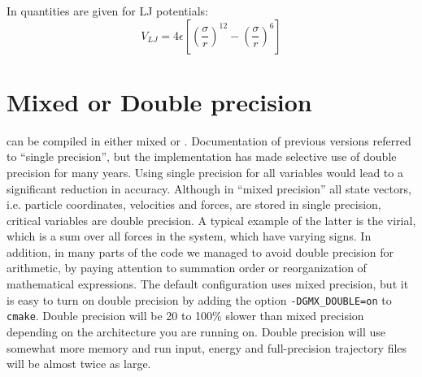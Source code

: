 In  quantities are given for LJ potentials:
\begin{equation}
V_{LJ} = 4\epsilon \left[ \left(\frac{\sigma}{r}\right)^{12} - \left(\frac{\sigma}{r}\right)^{6} \right]
\end{equation}



\section{Mixed or Double precision}
{\gromacs} can be compiled in either mixed or
. Documentation of previous {\gromacs}
versions referred to ``single precision'', but the implementation
has made selective use of double precision for many years.
Using single precision
for all variables would lead to a significant reduction in accuracy.
Although in ``mixed precision'' all state vectors, i.e. particle coordinates,
velocities and forces, are stored in single precision, critical variables
are double precision. A typical example of the latter is the virial,
which is a sum over all forces in the system, which have varying signs.
In addition, in many parts of the code we managed to avoid double precision
for arithmetic, by paying attention to summation order or reorganization
of mathematical expressions. The default configuration uses mixed precision,
but it is easy to turn on double precision by adding the option
{\tt -DGMX_DOUBLE=on} to {\tt cmake}. Double precision
will be 20 to 100\% slower than mixed precision depending on the
architecture you are running on. Double precision will use somewhat
more memory and run input, energy and full-precision trajectory files
will be almost twice as large.


